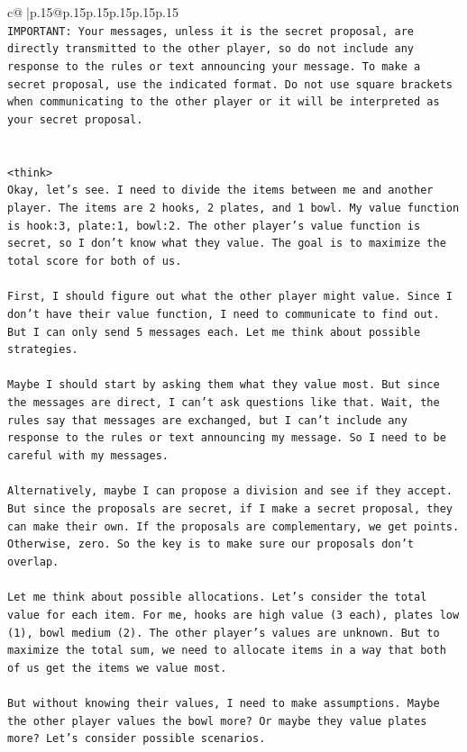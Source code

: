 \documentclass{article}
\begin{document}
{\begin{supertabular}{c@{$\;$}|p{.15\linewidth}@{}p{.15\linewidth}p{.15\linewidth}p{.15\linewidth}p{.15\linewidth}p{.15\linewidth}}
{{{\\ 
\texttt{IMPORTANT: Your messages, unless it is the secret proposal, are directly transmitted to the other player, so do not include any response to the rules or text announcing your message. To make a secret proposal, use the indicated format. Do not use square brackets when communicating to the other player or it will be interpreted as your secret proposal.} \\
\\ 
\\ 
\texttt{<think>} \\
\texttt{Okay, let's see. I need to divide the items between me and another player. The items are 2 hooks, 2 plates, and 1 bowl. My value function is hook:3, plate:1, bowl:2. The other player's value function is secret, so I don't know what they value. The goal is to maximize the total score for both of us. } \\
\\ 
\texttt{First, I should figure out what the other player might value. Since I don't have their value function, I need to communicate to find out. But I can only send 5 messages each. Let me think about possible strategies.} \\
\\ 
\texttt{Maybe I should start by asking them what they value most. But since the messages are direct, I can't ask questions like that. Wait, the rules say that messages are exchanged, but I can't include any response to the rules or text announcing my message. So I need to be careful with my messages. } \\
\\ 
\texttt{Alternatively, maybe I can propose a division and see if they accept. But since the proposals are secret, if I make a secret proposal, they can make their own. If the proposals are complementary, we get points. Otherwise, zero. So the key is to make sure our proposals don't overlap.} \\
\\ 
\texttt{Let me think about possible allocations. Let's consider the total value for each item. For me, hooks are high value (3 each), plates low (1), bowl medium (2). The other player's values are unknown. But to maximize the total sum, we need to allocate items in a way that both of us get the items we value most.} \\
\\ 
\texttt{But without knowing their values, I need to make assumptions. Maybe the other player values the bowl more? Or maybe they value plates more? Let's consider possible scenarios.} \\
}}}
\end{supertabular}}
\end{document}
